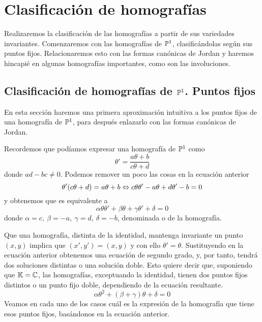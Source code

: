 \chapter{Clasificación de homografías}
Realizaremos la clasificación de las homografías a partir de sus variedades invariantes. Comenzaremos con las homografías de $\mathbb{P}^1$, clasificándolas según sus puntos fijos. Relacionaremos esto con las formas canónicas de Jordan y haremos hincapié en algunas homografías importantes, como son las involuciones.

\section{Clasificación de homografías de $\mathbb{P}^1$. Puntos fijos}
En esta sección haremos una primera aproximación intuitiva a los puntos fijos de una homografía de $\mathbb{P}^1$, para después enlazarlo con las formas canónicas de Jordan.

Recordemos que podíamos expresar una homografía de $\mathbb{P}^1$ como
\begin{equation}
	\label{C6_transformada_moebius}
	\theta'=\frac{a\theta+b}{c\theta +d}
\end{equation}
donde $ad-bc\not=0$. Podemos remover un poco las cosas en la ecuación anterior
\begin{equation}
	\theta'(c\theta+d)=a\theta+b\Leftrightarrow c\theta\theta'-a\theta+d\theta'-b=0
\end{equation}
y obtenemos que es equivalente a 
\begin{equation}
	\label{C6_eq_homografia_segundo_orden}
	\alpha\theta\theta'+\beta\theta+\gamma\theta'+\delta=0
\end{equation}
donde $\alpha=c, \ \beta=-a, \ \gamma=d, \ \delta=-b$, denominada  o  de la homografía.

Que una homografía, distinta de la identidad, mantenga invariante un punto $(x,y)$ implica que $(x',y')=(x,y)$ y con ello $\theta'=\theta$. Sustituyendo en la ecuación anterior obtenemos una ecuación de segundo grado, y, por tanto, tendrá dos soluciones distintas o una solución doble. Esto quiere decir que, suponiendo que $\mathbb{K}=\mathbb{C}$, las homografías, exceptuando la identidad, tienen dos puntos fijos distintos o un punto fijo doble, dependiendo de la ecuación resultante.
\begin{equation}
	\label{C6_eq_homografia_segundo_orden_punto_fijo}
	\alpha\theta^2+(\beta+\gamma)\theta+\delta=0
\end{equation}
Veamos en cada uno de los casos cuál es la expresión de la homografía que tiene esos puntos fijos, basándonos en la ecuación anterior.

